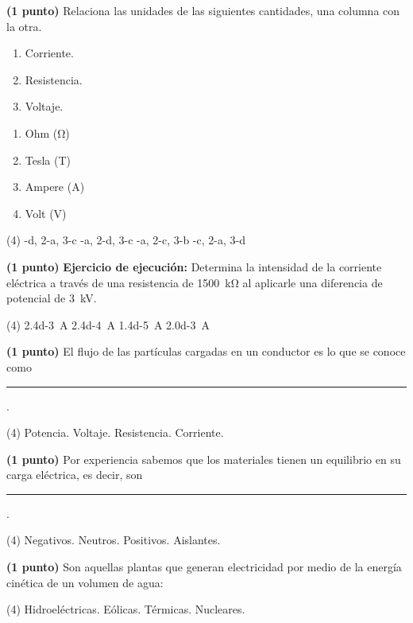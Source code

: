 \documentclass[12pt, letter]{exam}
\begin{document}
\begin{questions}
    \question \textbf{(1 punto)} Relaciona las unidades de las siguientes cantidades, una columna con la otra.
    \\
    \begin{minipage}[t]{0.4\linewidth}
        \begin{enumerate}[label=\arabic*)]
            \item Corriente.
            \item Resistencia.
            \item Voltaje.
        \end{enumerate}
    \end{minipage}
    \begin{minipage}[t]{0.4\linewidth}
        \begin{enumerate}[label=\alph*)]
            \item Ohm (\si{\ohm})
            \item Tesla (T)
            \item Ampere (\si{\ampere})
            \item Volt (\si{\volt})
        \end{enumerate}
    \end{minipage}
    \begin{tasks}(4)
        -d, 2-a, 3-c
        -a, 2-d, 3-c
        -a, 2-c, 3-b
        -c, 2-a, 3-d
    \end{tasks}
    \question \textbf{(1 punto)} \label{Problema_02} \textbf{Ejercicio de ejecución: } Determina la intensidad de la corriente eléctrica a través de una resistencia de \SI{1500}{\kilo\ohm} al aplicarle una diferencia de potencial de \SI{3}{\kilo\volt}.
    \begin{tasks}(4)
        \task \SI{2.4d-3}{\ampere}
        \task \SI{2.4d-4}{\ampere}
        \task \SI{1.4d-5}{\ampere}
        \task \SI{2.0d-3}{\ampere}
    \end{tasks}
    \question \textbf{(1 punto)} El flujo de las partículas cargadas en un conductor es lo que se conoce como \rule{2cm}{0.1mm}.
    \begin{tasks}(4)
        \task Potencia.
        \task Voltaje.
        \task Resistencia.
        \task Corriente.
    \end{tasks}
    \question \textbf{(1 punto)} Por experiencia sabemos que los materiales tienen un equilibrio en su carga eléctrica, es decir, son \rule{2cm}{0.1mm}.
    \begin{tasks}(4)
        \task Negativos.
        \task Neutros.
        \task Positivos.
        \task Aislantes.
    \end{tasks}
    \question \textbf{(1 punto)} Son aquellas plantas que generan electricidad por medio de la energía cinética de un volumen de agua:
    \begin{tasks}(4)
        \task Hidroeléctricas.
        \task Eólicas.
        \task Térmicas.
        \task Nucleares.
    \end{tasks}


\end{questions}
\end{document}

